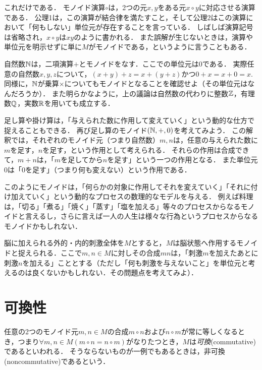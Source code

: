 \documentclass[11pt,a4paper,uplatex]{jsarticle}
\begin{document}
これだけである．
モノイド演算$\circ$は，2つの元$x,y$をある元$x \circ y$に対応させる演算である．
公理1は，この演算が結合律を満たすこと，そして公理2はこの演算において「何もしない」単位元が存在することを言っている．
しばしば演算記号は省略され，$x \circ y$は$xy$のように書かれる．
また誤解が生じないときは，演算や単位元を明示せずに単に$M$がモノイドである，というように言うこともある．


\begin{example}
自然数$\mathbb{N}$は，二項演算$+$とモノイドをなす．ここでの単位元は$0$である．
実際任意の自然数$x, y, z$について，$(x+y)+z = x + (y+z)$かつ$0 + x = x + 0 = x$. 
同様に，$\mathbb{N}$が乗算$\times$についてもモノイドとなることを確認せよ（その単位元はなんだろうか）．
また明らかなように，上の議論は自然数の代わりに整数$\mathbb{Z}$，有理数$\mathbb{Q}$，実数$\mathbb{R}$を用いても成立する．
\end{example}

\begin{example}
    足し算や掛け算は，「与えられた数に作用して変えていく」という動的な仕方で捉えることもできる．
    再び足し算のモノイド$(\mathbb{N}, +, 0)$を考えてみよう．
    この解釈では，それぞれのモノイド元（つまり自然数）$m, n$は，任意の与えられた数に$m$を足す，$n$を足す，という作用として考えられる．
    それらの作用は合成できて，$m+n$は，「$m$を足してから$n$を足す」という一つの作用となる．
    また単位元$0$は「$0$を足す」（つまり何も変えない）という作用である．

    このようにモノイドは，「何らかの対象に作用してそれを変えていく」「それに付け加えていく」という動的なプロセスの数理的なモデルを与える．
    例えば料理は，「切る」「煮る」「焼く」「蒸す」「塩を加える」等々のプロセスからなるモノイドと言えるし，さらに言えば一人の人生は様々な行為というプロセスからなるモノイドかもしれない．
\end{example}

\begin{example}
    脳に加えられる外的・内的刺激全体を$M$とすると，$M$は脳状態へ作用するモノイドと捉えられる．ここで$m, n \in M$に対しその合成$mn$は，「刺激$m$を加えたあとに刺激$n$を加える」こととする（ただし「何も刺激を与えないこと」を単位元と考えるのは良くないかもしれない．その問題点を考えてみよ）．
\end{example}

\section{可換性}
任意の2つのモノイド元$m,n \in M$の合成$m \circ n$および$n \circ m$が常に等しくなるとき，つまり$\forall m,n \in M (m \circ n = n \circ m)$がなりたつとき，$M$は\emph{可換}(commutative)であるといわれる．
そうならないものが一例でもあるときは，非可換(noncommutative)であるという．
\end{document}
